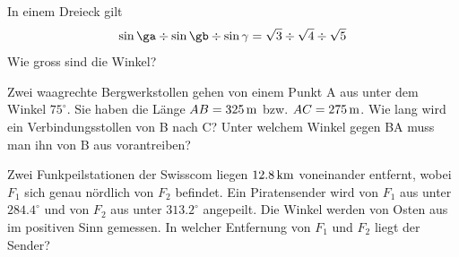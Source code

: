 \documentclass[%
11pt,%
twoside,%
titlepage,%
german,%
headsepline%
]{scrartcl}
\begin{document}
\begin{ueb}[Winkel]
In einem Dreieck gilt
$$\sin\ga\div\sin\gb\div\sin\gamma=\sqrt{3}\div\sqrt{4}\div\sqrt{5}$$
Wie gross sind die Winkel?
\end{ueb}
\begin{ueb}[Stollen]
Zwei waagrechte Bergwerkstollen gehen von einem Punkt A aus unter dem Winkel $75^\circ$. Sie haben die Länge $AB=\unit[325]{m}$ bzw. $AC=\unit[275]{m}$. Wie lang wird ein Verbindungsstollen von B nach C? Unter welchem Winkel gegen BA muss man ihn von B aus vorantreiben?
\end{ueb}
\begin{ueb}
Zwei Funkpeilstationen der Swisscom liegen $\unit[12.8]{km}$ voneinander entfernt, wobei $F_1$ sich genau nördlich von $F_2$ befindet. Ein Piratensender wird von $F_1$ aus unter $284.4^\circ$ und von $F_2$ aus unter $313.2^\circ$ angepeilt. Die Winkel werden von Osten aus im positiven Sinn gemessen. In welcher Entfernung von $F_1$ und $F_2$ liegt der Sender?
\end{ueb}
\end{document}
